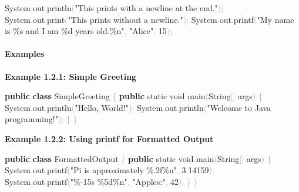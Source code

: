 \documentclass[
  justified,
  openright,
]{tufte-book}
\let\subsection\paragraph
\let\paragraph\paragraph
\newcommand{\KeywordTok}[1]{\textcolor{CodeKeyword}{\textbf{#1}}}  %
\newcommand{\StringTok}[1]{\textcolor{CodeString}{#1}}              %
\newcommand{\CodeNumTok}[1]{\textcolor{CodeNumber}{#1}}             %
\newcommand{\CodeFuncTok}[1]{\textcolor{CodeKeyword}{#1}}           %
\newcommand{\CodeTypeTok}[1]{\textcolor{CodeType}{#1}}              %
\newcommand{\OperatorTok}[1]{\textcolor{DarkGray}{#1}}              %
\newenvironment{Shaded}{%
  \begin{mdframed}[style=TufteCode]%
}{%
  \end{mdframed}%
}
\let\subsection\paragraph
\let\paragraph\paragraph
\begin{document}
\begin{Shaded}
\begin{Highlighting}[]
System\OperatorTok{.}\CodeFuncTok{out}\OperatorTok{.}\CodeFuncTok{println}\OperatorTok{(}\StringTok{"This prints with a newline at the end."}\OperatorTok{);}
System\OperatorTok{.}\CodeFuncTok{out}\OperatorTok{.}\CodeFuncTok{print}\OperatorTok{(}\StringTok{"This prints without a newline."}\OperatorTok{);}
System\OperatorTok{.}\CodeFuncTok{out}\OperatorTok{.}\CodeFuncTok{printf}\OperatorTok{(}\StringTok{"My name is }\StringTok{\%s}\StringTok{ and I am }\StringTok{\%d}\StringTok{ years old.}\StringTok{\%n}\StringTok{"}\OperatorTok{,} \StringTok{"Alice"}\OperatorTok{,} \CodeNumTok{15}\OperatorTok{);}
\end{Highlighting}
\end{Shaded}

\subsection{Examples}\label{examples-20}

\textbf{Example 1.2.1: Simple Greeting}

\begin{Shaded}
\begin{Highlighting}[]
\KeywordTok{public} \KeywordTok{class} SimpleGreeting \OperatorTok{\{}
    \KeywordTok{public} \CodeTypeTok{static} \CodeTypeTok{void} \CodeFuncTok{main}\OperatorTok{(}String\OperatorTok{[]} args\OperatorTok{)} \OperatorTok{\{}
        System\OperatorTok{.}\CodeFuncTok{out}\OperatorTok{.}\CodeFuncTok{println}\OperatorTok{(}\StringTok{"Hello, World!"}\OperatorTok{);}
        System\OperatorTok{.}\CodeFuncTok{out}\OperatorTok{.}\CodeFuncTok{println}\OperatorTok{(}\StringTok{"Welcome to Java programming!"}\OperatorTok{);}
    \OperatorTok{\}}
\OperatorTok{\}}
\end{Highlighting}
\end{Shaded}

\textbf{Example 1.2.2: Using printf for Formatted Output}

\begin{Shaded}
\begin{Highlighting}[]
\KeywordTok{public} \KeywordTok{class} FormattedOutput \OperatorTok{\{}
    \KeywordTok{public} \CodeTypeTok{static} \CodeTypeTok{void} \CodeFuncTok{main}\OperatorTok{(}String\OperatorTok{[]} args\OperatorTok{)} \OperatorTok{\{}
        System\OperatorTok{.}\CodeFuncTok{out}\OperatorTok{.}\CodeFuncTok{printf}\OperatorTok{(}\StringTok{"Pi is approximately }\StringTok{\%.2f\%n}\StringTok{"}\OperatorTok{,} \CodeNumTok{3.14159}\OperatorTok{);}
        System\OperatorTok{.}\CodeFuncTok{out}\OperatorTok{.}\CodeFuncTok{printf}\OperatorTok{(}\StringTok{"}\StringTok{\%{-}15s}\StringTok{ }\StringTok{\%5d\%n}\StringTok{"}\OperatorTok{,} \StringTok{"Apples:"}\OperatorTok{,} \CodeNumTok{42}\OperatorTok{);}
    \OperatorTok{\}}
\OperatorTok{\}}
\end{Highlighting}
\end{Shaded}
\end{document}
